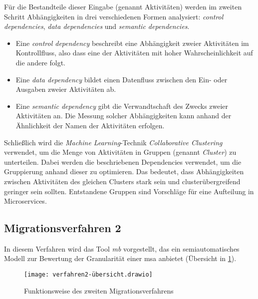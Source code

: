 Für die Bestandteile dieser Eingabe (genannt Aktivitäten) werden im zweiten Schritt Abhängigkeiten in drei verschiedenen Formen analysiert: \emph{control dependencies}, \emph{data dependencies} und \emph{semantic dependencies}.
\begin{itemize}
	\item Eine \emph{control dependency} beschreibt eine Abhängigkeit zweier Aktivitäten im Kontrollfluss, also dass eine der Aktivitäten mit hoher Wahrscheinlichkeit auf die andere folgt.
	\item Eine \emph{data dependency} bildet einen Datenfluss zwischen den Ein- oder Ausgaben zweier Aktivitäten ab.
	\item Eine \emph{semantic dependency} gibt die Verwandtschaft des Zwecks zweier Aktivitäten an.
	Die Messung solcher Abhängigkeiten kann anhand der Ähnlichkeit der Namen der Aktivitäten erfolgen.
\end{itemize}

Schließlich wird die \emph{Machine Learning}-Technik \emph{Collaborative Clustering} verwendet, um die Menge von Aktivitäten in Gruppen (genannt \emph{Cluster}) zu unterteilen.
Dabei werden die beschriebenen Dependencies verwendet, um die Gruppierung anhand dieser zu optimieren.
Das bedeutet, dass Abhängigkeiten zwischen Aktivitäten des gleichen Clusters stark sein und clusterübergreifend geringer sein sollten.
Entstandene Gruppen sind Vorschläge für eine Aufteilung in Microservices.

\subsection{Migrationsverfahren 2}

In diesem Verfahren wird das Tool \emph{\acrfull{mb}} vorgestellt, das ein semiautomatisches Modell zur Bewertung der Granularität einer \gls{msa} anbietet (Übersicht in \cref{fig:interviews-migrationsverfahren2}).

\begin{figure}[!ht]
	\centering
	\texttt{[image: verfahren2-übersicht.drawio]}
	\caption[Funktionsweise Migrationsverfahren 2]{
		Funktionsweise des zweiten Migrationsverfahrens
	}
	\label{fig:interviews-migrationsverfahren2}
\end{figure}

